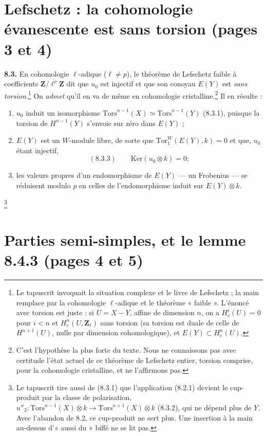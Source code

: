\documentclass[11pt,a4paper]{article}
\begin{document}
\section*{Lefschetz : la cohomologie évanescente est sans torsion (pages 3 et 4)}

\textbf{8.3.} En cohomologie $\ell$-adique ($\ell \neq p$), le théorème de
Lefschetz faible à coefficients $\mathbf{Z}/\ell^{\nu}\mathbf{Z}$ dit que
$u_{0}$ est injectif et que son conoyau $E(Y)$ est \emph{sans
torsion}.\footnote{Le tapuscrit invoquait la situation complexe et le livre
de Lefschetz ; la main remplace par la cohomologie $\ell$-adique et le
théorème « faible ». L'énoncé avec torsion est juste : si $U = X - Y$, affine
de dimension $n$, on a $H^{i}_{c}(U) = 0$ pour $i < n$ et
$H^{n}_{c}(U, \mathbf{Z}_{\ell})$ sans torsion (sa torsion est duale de celle
de $H^{n+1}(U)$, nulle par dimension cohomologique), et $E(Y) \subset
H^{n}_{c}(U)$.} On \emph{admet} qu'il en va de même en cohomologie
cristalline.\footnote{C'est l'hypothèse la plus forte du texte. Nous ne
connaissons pas avec certitude l'état actuel de ce théorème de Lefschetz
entier, torsion comprise, pour la cohomologie cristalline, et ne
l'affirmons pas.}
Il en résulte :
\begin{enumerate}
\item[(i)] $u_{0}$ induit un isomorphisme $\mathrm{Tors}^{n-1}(X) \simeq
\mathrm{Tors}^{n-1}(Y)$ (8.3.1), puisque la torsion de $H^{n-1}(Y)$ s'envoie
sur zéro dans $E(Y)$ ;
\item[(ii)] $E(Y)$ est un $W$-module libre, de sorte que
$\mathrm{Tor}^{W}_{1}(E(Y), k) = 0$ et que, $u_{0}$ étant injectif,
\[
(8.3.3) \qquad \mathrm{Ker}(u_{0} \otimes k) = 0 ;
\]
\item[(iii)] les valeurs propres d'un endomorphisme de $E(Y)$ --- un
Frobenius --- se réduisent modulo $p$ en celles de l'endomorphisme induit sur
$E(Y) \otimes k$.
\end{enumerate}
\footnote{Le tapuscrit tire aussi de (8.3.1) que l'application (8.2.1) devient
le cup-produit par la classe de polarisation,
$u''_{2} : \mathrm{Tors}^{n-1}(X) \otimes k \to \mathrm{Tors}^{n+1}(X) \otimes
k$ (8.3.2), qui ne dépend plus de $Y$. Avec l'abandon de 8.2, ce
cup-produit ne sert plus. Une insertion à la main au-dessus d'« aussi du »
biffé ne se lit pas.}

\section*{Parties semi-simples, et le lemme 8.4.3 (pages 4 et 5)}
\end{document}
